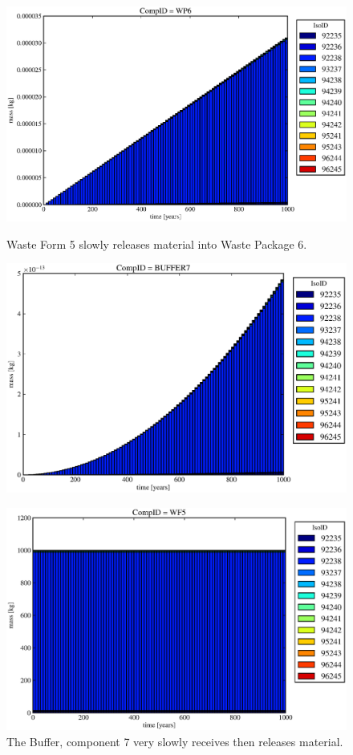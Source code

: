 \begin{figure}[ht]
\begin{minipage}[b]{0.45\linewidth}
  \includegraphics[width=\textwidth]{./images/od2.eps}
  \caption[Case ODI Waste Form Contaminants.]{
    Waste Form 5 slowly releases material into Waste Package 6.
    }
  \label{fig:drIVwf5}
  \includegraphics[width=\textwidth]{./images/od3.eps}
  \caption[Case ODI Buffer Contaminants]{
    The Buffer, component 7 very slowly receives then releases material.
    }
  \label{fig:drIVbuff}
\end{minipage}
\hspace{0.05\linewidth}
\begin{minipage}[b]{0.45\linewidth}
  \includegraphics[width=\textwidth]{./images/od1.eps}

\end{minipage}
\end{figure}
